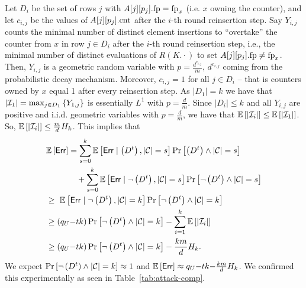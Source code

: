 Let $D_i$ be the set of rows $j$ with $A[j][p_j].\textup{fp} = \textup{fp}_x$ (i.e. $x$ owning the counter), and let $c_{i,j}$ be the values of $A[j][p_j].\textup{cnt}$ after the $i$-th round reinsertion step.
Say $Y_{i,j}$ counts the minimal number of distinct element insertions to ``overtake'' the counter from $x$ in row $j \in  D_i$ after the $i$-th round reinsertion step, i.e., the minimal number of distinct evaluations of $R(K. \cdot)$ to set $A[j][p_j].\textup{fp} \neq \textup{fp}_x$. 
Then, $Y_{i,j}$ is a geometric random variable with $p = \frac{d^{c_{i,j}}}{m}$, $d^{c_{i,j}}$ coming from the probabilistic decay mechanism.
Moreover, $c_{i,j}=1$ for all $j \in D_i$ -- that is counters owned by $x$ equal 1 after every reinsertion step.
As $|D_1| = k$ we have that $|\mathcal{I}_1|  =\max_{j \in D_1} \left\{ Y_{1,j}\right\}$ is essentially $L^1$ with $p = \frac{d}{m}$.
Since $|D_i| \leq k$ and all $Y_{i,j}$ are positive and i.i.d.
geometric variables with $p = \frac{d}{m}$, we have that $\mathbb{E}\left[|\mathcal{I}_i|\right] \leq \mathbb{E}\left[|\mathcal{I}_1|\right] $. So, $\mathbb{E}\left[|\mathcal{I}_i| \right]\leq \frac{m}{d}H_{k}$.
This implies that
\begin{align*}
	&\mathbb{E}\left[\mathsf{Err}\right] 
	= \sum_{s = 0}^{k} \mathbb{E}\left[ \mathsf{Err} \mid \left(D^t\right), |\mathcal{C}| = s \right] \Pr\left[\left(D^t\right) \land |\mathcal{C}| = s \right] \\
	&\ \ \ \ \ \ \ \ \ \ \ + \sum_{s = 0}^{k} \mathbb{E}\left[ \mathsf{Err} \mid \lnot \left(D^t\right), |\mathcal{C}| = s \right] \Pr\left[\lnot \left(D^t\right)  \land |\mathcal{C}| = s \right] \\
	&\geq \ \mathbb{E}\left[ \mathsf{Err} \mid \lnot \left(D^t\right), |\mathcal{C}| = k\right] \Pr\left[\lnot \left(D^t\right) \land |\mathcal{C}| = k\right]\\
	&\geq  \left(q_U{-}tk\right)\Pr\left[\lnot \left(D^t\right) \land |\mathcal{C}| = k\right] - \sum_{i = 1}^{k} \mathbb{E}\left[|\mathcal{I}_i|\right] \\
	&\geq  \left(q_U{-}tk\right)\Pr\left[\lnot \left(D^t\right) \land |\mathcal{C}| = k\right] - \frac{km}{d}H_k.
\end{align*}
We expect $\Pr\left[\lnot \left(D^t\right) \land |\mathcal{C}| = k\right] \approx 1$ and
$\mathbb{E}\left[\mathsf{Err}\right] \allowbreak \approx q_U{-}tk{-}\frac{km}{d}H_k$. We confirmed this experimentally as seen in Table~\ref{tab:attack-comp}.


